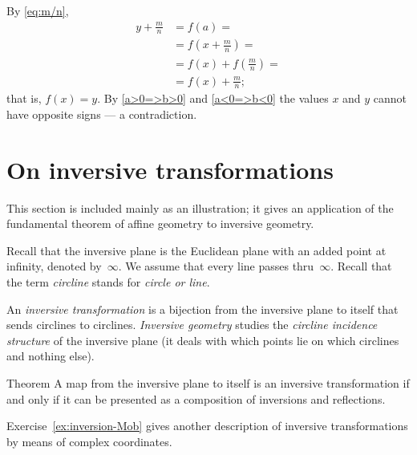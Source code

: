 By \ref{eq:m/n},
\begin{align*}
y+\tfrac{m}{n}&=f(a)=
\\
&=f(x+\tfrac{m}{n})=
\\
&=f(x)+f(\tfrac{m}{n})=
\\
&=f(x)+\tfrac{m}{n};
\end{align*}
that is, $f(x)=y$.
By \ref{a>0=>b>0} and \ref{a<0=>b<0} the values $x$ and $y$ cannot have opposite signs --- a contradiction.
\qeds




\section{On inversive transformations}

This section is included mainly as an illustration;
it gives an application of the fundamental theorem of affine geometry to inversive geometry.

Recall that the inversive plane is the Euclidean plane with an added point at infinity, denoted by~$\infty$.
We assume that every line passes thru~$\infty$.
Recall that the term {}\emph{circline} stands for \textit{circle or line}.

An \emph{inversive transformation} is a bijection from the inversive plane to itself that sends circlines to circlines.
{}\emph{Inversive geometry} studies the {}\emph{circline incidence structure} of the inversive plane
(it deals with which points lie on which circlines and nothing else).

\begin{thm}{Theorem}\label{thm:inversions-inversive}
A map from the inversive plane to itself is an inversive transformation
if and only if it can be presented as a composition of inversions and reflections.  
\end{thm}

Exercise~\ref{ex:inversion-Mob} gives another description of inversive transformations by means of complex coordinates.

